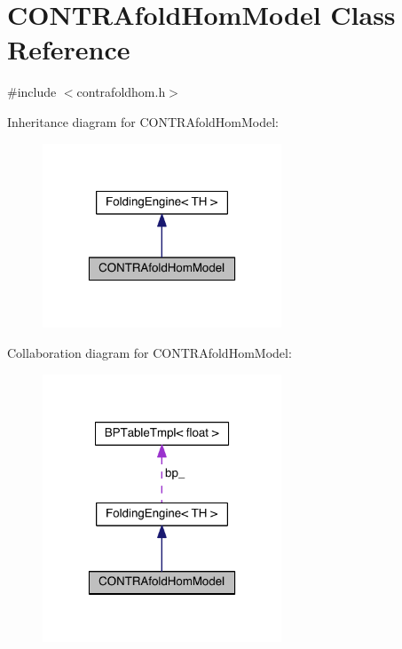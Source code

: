 \hypertarget{class_c_o_n_t_r_afold_hom_model}{\section{C\+O\+N\+T\+R\+Afold\+Hom\+Model Class Reference}
\label{class_c_o_n_t_r_afold_hom_model}
}


{\ttfamily \#include $<$contrafoldhom.\+h$>$}



Inheritance diagram for C\+O\+N\+T\+R\+Afold\+Hom\+Model\+:
\nopagebreak
\begin{figure}[H]
\begin{center}
\leavevmode
\includegraphics[width=202pt]{class_c_o_n_t_r_afold_hom_model__inherit__graph}
\end{center}
\end{figure}


Collaboration diagram for C\+O\+N\+T\+R\+Afold\+Hom\+Model\+:
\nopagebreak
\begin{figure}[H]
\begin{center}
\leavevmode
\includegraphics[width=202pt]{class_c_o_n_t_r_afold_hom_model__coll__graph}
\end{center}
\end{figure}
